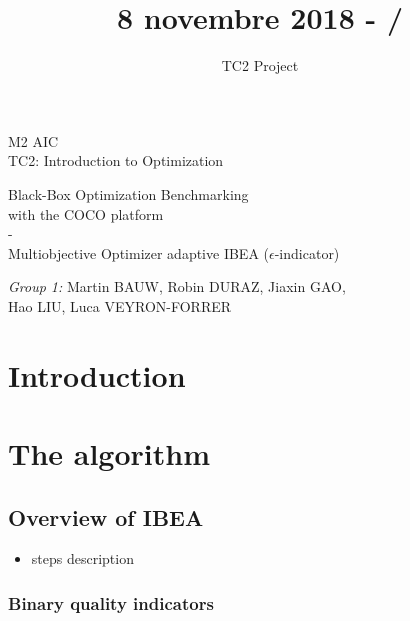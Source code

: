 \documentclass{beamer}
\title{8 novembre 2018 - \insertframenumber/\inserttotalframenumber}
\author{TC2 Project}
\begin{document}
\begin{frame}
\begin{center}
{ M2 AIC\\\footnotesize TC2: Introduction to Optimization}
\vfill
{\large
\begin{framed}
Black-Box Optimization Benchmarking\\ with the COCO platform\\ - \\Multiobjective Optimizer adaptive IBEA ($\epsilon$-indicator) 
\end{framed}
}
\vfill

{\footnotesize \vfill \textit{Group 1:} Martin BAUW, Robin DURAZ, Jiaxin GAO,\\ Hao LIU, Luca VEYRON-FORRER}
\end{center}
\end{frame}

\begin{frame}
\tableofcontents
\end{frame}

\section{Introduction}
\begin{frame}

\end{frame}


\section{The algorithm}
\subsection{Overview of IBEA}
\begin{frame}
\begin{itemize}
\item steps description
\end{itemize}
\end{frame}


\begin{frame}
\frametitle{Binary quality indicators}

\end{frame}
\end{document}

